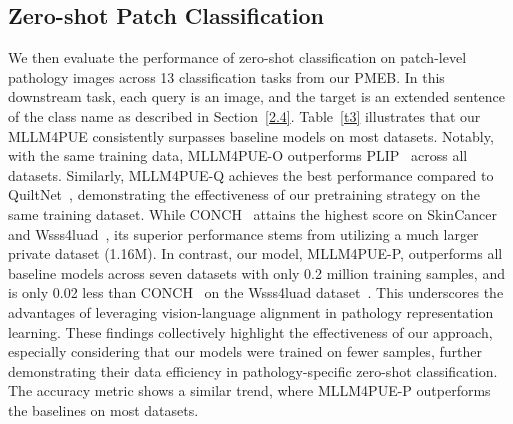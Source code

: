 \subsection{Zero-shot Patch Classification}
We then evaluate the performance of zero-shot classification on patch-level pathology images across 13 classification tasks from our PMEB. In this downstream task, each query is an image, and the target is an extended sentence of the class name as described in Section~\ref{2.4}. Table~\ref{t3} illustrates that our MLLM4PUE consistently surpasses baseline models on most datasets. Notably, with the same training data, MLLM4PUE-O outperforms PLIP~\cite{huang2023visual} across all datasets. Similarly, MLLM4PUE-Q achieves the best performance compared to QuiltNet~\cite{ikezogwo2024quilt}, demonstrating the effectiveness of our pretraining strategy on the same training dataset. While CONCH~\cite{lu2024visual} attains the highest score on SkinCancer~\cite{kriegsmann2022deep} and Wsss4luad~\cite{han2022wsss4luad}, its superior performance stems from utilizing a much larger private dataset (1.16M). In contrast, our model, MLLM4PUE-P, outperforms all baseline models across seven datasets with only 0.2 million training samples, and is only 0.02 less than CONCH~\cite{lu2024visual} on the Wsss4luad dataset~\cite{han2022wsss4luad}. This underscores the advantages of leveraging vision-language alignment in pathology representation learning. These findings collectively highlight the effectiveness of our approach, especially considering that our models were trained on fewer samples, further demonstrating their data efficiency in pathology-specific zero-shot classification. The accuracy metric shows a similar trend, where MLLM4PUE-P outperforms the baselines on most datasets.


